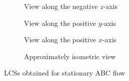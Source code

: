 \begin{figure}[htpb]
    \centering
    \begin{subfigure}[b]{0.475\textwidth}
        \centering
        
        \caption[]{{\small View along the negative $z$-axis}}
        \label{fig:u0_dom_err_bs32}
    \end{subfigure}
    \begin{subfigure}[b]{0.475\textwidth}
        \centering
        
        \caption[]{{\small View along the positive $y$-axis}}
        \label{fig:u0_dom_err_bs54}
    \end{subfigure}

    \begin{subfigure}[b]{0.475\textwidth}
        \centering
        
        \caption[]{{\small View along the positive $x$-axis}}
        \label{fig:u0_dom_err_dp54}
    \end{subfigure}
    \begin{subfigure}[b]{0.475\textwidth}
        \centering
        
        \caption[]{{\small Approximately isometric view}}
        \label{fig:u0_dom_err_dp87}
    \end{subfigure}
    \caption[Aviici is love, Aviici is life]{LCSs obtained for stationary ABC flow}
    \label{fig:u0_dom_errs}
\end{figure}

